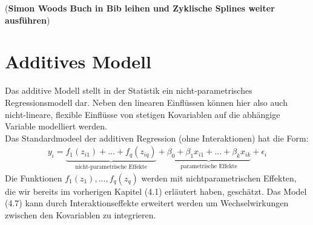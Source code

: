 \documentclass[12pt]{scrreprt}
\begin{document}
(\textbf{Simon Woods Buch in Bib leihen und Zyklische Splines weiter ausführen})


\section{Additives Modell}

Das additive Modell stellt in der Statistik ein nicht-parametrisches Regressionsmodell dar. Neben den linearen Einﬂüssen können hier also auch nicht-lineare, flexible Einflüsse von stetigen Kovariablen auf die abhängige Variable modelliert werden. \\
Das Standardmodeel der additiven Regression (ohne Interaktionen) hat die Form:
\begin{align} 
y_{i}=\underbrace{f_{1}(z_{i1})+...+f_{q}(z_{iq})}_{\text{nicht-parametrische Effekte}}+\underbrace{\beta_{0}+\beta_{1}x_{i1}+...+\beta_{k}x_{ik}}_{\text{parametrische Effekte}}+\epsilon_{i}
\end{align}
Die Funktionen $f_{1}(z_{1}),...,f_{q}(z_{q})$ werden mit nichtparametrischen Effekten, die wir bereits im vorherigen Kapitel (4.1) erläutert haben, geschätzt. Das Model (4.7) kann durch Interaktionseffekte erweitert werden um Wechselwirkungen zwischen den Kovariablen zu integrieren.\\
\end{document}
